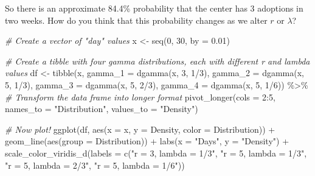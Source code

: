 \documentclass[
]{article}
\newenvironment{Shaded}{\begin{snugshade}}{\end{snugshade}}
\newcommand{\AttributeTok}[1]{\textcolor[rgb]{0.77,0.63,0.00}{#1}}
\newcommand{\CommentTok}[1]{\textcolor[rgb]{0.56,0.35,0.01}{\textit{#1}}}
\newcommand{\DecValTok}[1]{\textcolor[rgb]{0.00,0.00,0.81}{#1}}
\newcommand{\FloatTok}[1]{\textcolor[rgb]{0.00,0.00,0.81}{#1}}
\newcommand{\FunctionTok}[1]{\textcolor[rgb]{0.00,0.00,0.00}{#1}}
\newcommand{\NormalTok}[1]{#1}
\newcommand{\OtherTok}[1]{\textcolor[rgb]{0.56,0.35,0.01}{#1}}
\newcommand{\SpecialCharTok}[1]{\textcolor[rgb]{0.00,0.00,0.00}{#1}}
\newcommand{\StringTok}[1]{\textcolor[rgb]{0.31,0.60,0.02}{#1}}
\begin{document}
So there is an approximate 84.4\% probability that the center has 3 adoptions in two weeks. How do you think that this probability changes as we alter \(r\) or \(\lambda\)?

\begin{Shaded}
\begin{Highlighting}[]
\CommentTok{\# Create a vector of "day" values}
\NormalTok{x }\OtherTok{\textless{}{-}} \FunctionTok{seq}\NormalTok{(}\DecValTok{0}\NormalTok{, }\DecValTok{30}\NormalTok{, }\AttributeTok{by =} \FloatTok{0.01}\NormalTok{)}

\CommentTok{\# Create a tibble with four gamma distributions, each with different r and lambda values}
\NormalTok{df }\OtherTok{\textless{}{-}} \FunctionTok{tibble}\NormalTok{(x, }
             \AttributeTok{gamma\_1 =} \FunctionTok{dgamma}\NormalTok{(x, }\DecValTok{3}\NormalTok{, }\DecValTok{1}\SpecialCharTok{/}\DecValTok{3}\NormalTok{), }
             \AttributeTok{gamma\_2 =} \FunctionTok{dgamma}\NormalTok{(x, }\DecValTok{5}\NormalTok{, }\DecValTok{1}\SpecialCharTok{/}\DecValTok{3}\NormalTok{),}
             \AttributeTok{gamma\_3 =} \FunctionTok{dgamma}\NormalTok{(x, }\DecValTok{5}\NormalTok{, }\DecValTok{2}\SpecialCharTok{/}\DecValTok{3}\NormalTok{),}
             \AttributeTok{gamma\_4 =} \FunctionTok{dgamma}\NormalTok{(x, }\DecValTok{5}\NormalTok{, }\DecValTok{1}\SpecialCharTok{/}\DecValTok{6}\NormalTok{)) }\SpecialCharTok{\%\textgreater{}\%} 
  \CommentTok{\# Transform the data frame into longer format}
  \FunctionTok{pivot\_longer}\NormalTok{(}\AttributeTok{cols =} \DecValTok{2}\SpecialCharTok{:}\DecValTok{5}\NormalTok{, }\AttributeTok{names\_to =} \StringTok{"Distribution"}\NormalTok{, }\AttributeTok{values\_to =} \StringTok{"Density"}\NormalTok{)}

\CommentTok{\# Now plot!}
\FunctionTok{ggplot}\NormalTok{(df, }\FunctionTok{aes}\NormalTok{(}\AttributeTok{x =}\NormalTok{ x, }\AttributeTok{y =}\NormalTok{ Density, }\AttributeTok{color =}\NormalTok{ Distribution)) }\SpecialCharTok{+}
  \FunctionTok{geom\_line}\NormalTok{(}\FunctionTok{aes}\NormalTok{(}\AttributeTok{group =}\NormalTok{ Distribution)) }\SpecialCharTok{+}
  \FunctionTok{labs}\NormalTok{(}\AttributeTok{x =} \StringTok{"Days"}\NormalTok{, }\AttributeTok{y =} \StringTok{"Density"}\NormalTok{) }\SpecialCharTok{+}
  \FunctionTok{scale\_color\_viridis\_d}\NormalTok{(}\AttributeTok{labels =} \FunctionTok{c}\NormalTok{(}\StringTok{"r = 3, lambda = 1/3"}\NormalTok{,}
                                \StringTok{"r = 5, lambda = 1/3"}\NormalTok{,}
                                \StringTok{"r = 5, lambda = 2/3"}\NormalTok{,}
                                \StringTok{"r = 5, lambda = 1/6"}\NormalTok{))}
\end{Highlighting}
\end{Shaded}
\end{document}
